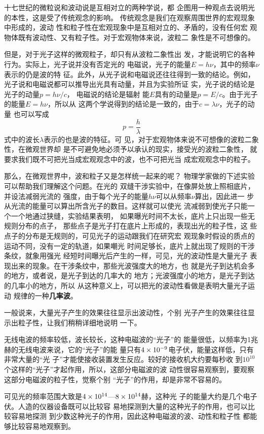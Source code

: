 十七世纪的微粒说和波动说是互相对立的两种学说，都
企图用一种观点去说明光的本性，这是受了传统观念的影响。
传统观念是我们在观察周围世界的宏观现象中形成的，波动
性和粒子性在宏观现象中是互相对立的、矛盾的，没有任何宏
观物体既有波动性、又有粒子性。对于宏观物体来说，波粒二
象性是不可想像的。

但是，对于光子这样的微观粒子，却只有从波粒二象性出
发，才能说明它的各种行为。实际上，光子说并没有否定光的
电磁说，光子的能量$E=h\nu$，其中的频率$\nu$表示的仍是波的特
征。此外，从光子说和电磁说还往往得到一致的结论。例如，
光子说和电磁说都可以推导出光具有动量，并且为实验所证
实，光子说的结论是光子的动量$p=h\nu/c$，
电磁说的结论是辐射
能$E$具有的动量是$p=E/c$。由于光子的能量$E=h\nu$，所以从
这两个学说得到的结论是一致的，由于$c=\lambda\nu$，光子的动量
也可以写成
$$p=\frac{h}{\lambda}$$
式中的波长$\lambda$表示的也是波的特征。可
见，对于宏观物体来说不可想像的波粒二象性，在微观世界却
是不可避免地必须予以承认的现实，接受光的波粒二象性，
就要求我们既不可把光当成宏观观念中的波，也不可把光当
成宏观观念中的粒子。

那么，在微观世界中，波和粒子又是怎样统一起来的呢？
物理学家做的下述实验可以帮助我们理解这个问题。在光的
双缝干涉实验中，在像屏处放上照相底片，并设法减弱光流的
强度，由于每个光子的能量$h\nu$可以从频率$\nu$算出，因此进一
步从光流的能量可以算出所含光子的数目。这样就可以使光
流减弱到使光子只能一个一个地通过狭缝，实验结果表明，
如果曝光时间不太长，底片上只出现一些无规则分布的点子，
那些点子是光子打在底片上形成的，表现出光的粒子性，这
些点子的分布是无规则的，可见光子的运动跟我们在研究宏
观现象时假设的质点的运动不同，没有一定的轨道，如果嘲光
时间足够长，底片上就出现了规则的干涉条纹，就象用强光
经短时间曝光后产生的一样，可见，光的波动性是大量光子
表现出来的现象。在干涉条纹中，那些光波强度大的地方，也
就是光子到达机会多的地方，或者说，是光子到达的几率大的
地方；光波强度小的地方，是光子到达的几率小的地方，所以
从这种意义上，可以把光的波动性看做是表明大量光子运动
规律的一种\textbf{几率波}。

一般说来，大量光子产生的效果往往显示出波动性，个别
光子产生的效果往往显示出粒子性，让我们稍稍详细地说明
一下。

无线电波的频率较低，波长较长，这种电磁波的“光子”的
能量很低，以频率为1兆赫的无线电波来说，它的“光子”的能
量只有$4\times10^{-9}$电子伏，能量这样低，只有非常大量的“光
子”才能使接收装置发生反应。较好的接收机大约要每秒收
到$10^{10}$个这样的“光子”才起作用，所以，这部分电磁波的波
动性很容易观察到，要观察这部分电磁波的粒子性，觉察个别
“光子”的作用，却是非常不容易的。

可见光的频率范围大致是$4\times10^{14}$—$8\times10^{14}$赫，这种光
子的能量大约是几个电子伏。人造的仪器设备既可以比较容
易地探测到大量的这种光子的作用，也可以比较容易地探测
到少数这种光子的作用，因此这种电磁波的波、动性和粒子性
都能够比较容易地观察到。

